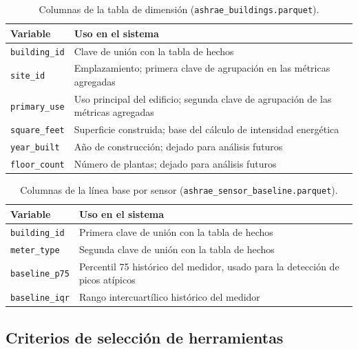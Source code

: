 \begin{table}[H]
  \centering
  \begin{tabular}{|l|p{9cm}|}
    \hline
    \textbf{Variable} & \textbf{Uso en el sistema} \\ \hline
    \texttt{building\_id} & Clave de unión con la tabla de hechos \\ \hline
    \texttt{site\_id} & Emplazamiento; primera clave de agrupación en las métricas agregadas \\ \hline
    \texttt{primary\_use} & Uso principal del edificio; segunda clave de agrupación de las métricas agregadas \\ \hline
    \texttt{square\_feet} & Superficie construida; base del cálculo de intensidad energética \\ \hline
    \texttt{year\_built} & Año de construcción; dejado para análisis futuros \\ \hline
    \texttt{floor\_count} & Número de plantas; dejado para análisis futuros \\ \hline
  \end{tabular}
  \caption{Columnas de la tabla de dimensión (\texttt{ashrae\_buildings.parquet}).}
  \label{tab:variables-dimension}
\end{table}

\begin{table}[H]
  \centering
  \begin{tabular}{|l|p{9cm}|}
    \hline
    \textbf{Variable} & \textbf{Uso en el sistema} \\ \hline
    \texttt{building\_id} & Primera clave de unión con la tabla de hechos \\ \hline
    \texttt{meter\_type} & Segunda clave de unión con la tabla de hechos \\ \hline
    \texttt{baseline\_p75} & Percentil 75 histórico del medidor, usado para la detección de picos atípicos \\ \hline
    \texttt{baseline\_iqr} & Rango intercuartílico histórico del medidor \\ \hline
  \end{tabular}
  \caption{Columnas de la línea base por sensor (\texttt{ashrae\_sensor\_baseline.parquet}).}
  \label{tab:variables-baseline}
\end{table}

\subsection{Criterios de selección de herramientas}

